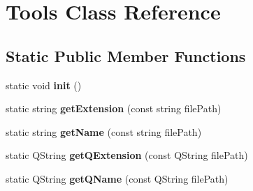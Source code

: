 \hypertarget{class_tools}{
\section{Tools Class Reference}
\label{class_tools}
}
\subsection*{Static Public Member Functions}
\begin{DoxyCompactItemize}
\item 
\hypertarget{class_tools_ac6ef165ebfc7ed8ee45823885c7dc73e}{
static void {\bfseries init} ()}
\label{class_tools_ac6ef165ebfc7ed8ee45823885c7dc73e}

\item 
\hypertarget{class_tools_acc3685e878a2b6f0dc302fb319704b35}{
static string {\bfseries getExtension} (const string filePath)}
\label{class_tools_acc3685e878a2b6f0dc302fb319704b35}

\item 
\hypertarget{class_tools_acb9d181a0bc8da9c7db0bd4403187624}{
static string {\bfseries getName} (const string filePath)}
\label{class_tools_acb9d181a0bc8da9c7db0bd4403187624}

\item 
\hypertarget{class_tools_a17da92e49e36f7be6312d7dff09e46a8}{
static QString {\bfseries getQExtension} (const QString filePath)}
\label{class_tools_a17da92e49e36f7be6312d7dff09e46a8}

\item 
\hypertarget{class_tools_ab0360359f528888da0b1ea5b8f7960c1}{
static QString {\bfseries getQName} (const QString filePath)}
\label{class_tools_ab0360359f528888da0b1ea5b8f7960c1}

\end{DoxyCompactItemize}
